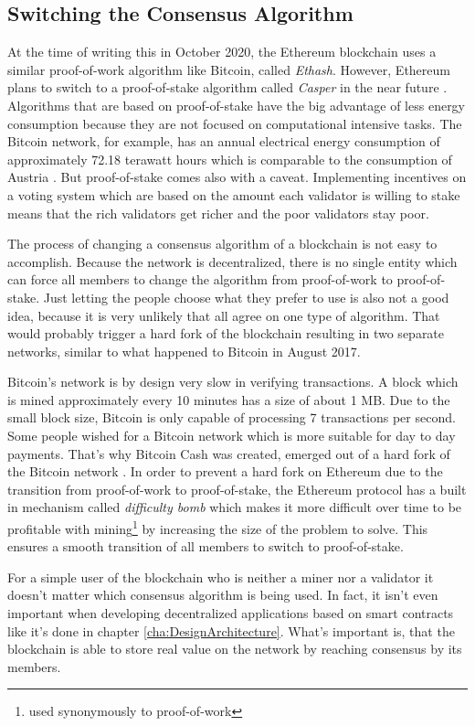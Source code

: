 \subsection{Switching the Consensus Algorithm}
At the time of writing this in October 2020, the Ethereum blockchain uses a similar proof-of-work algorithm like Bitcoin, called \textit{Ethash}. However, Ethereum plans to switch to a proof-of-stake algorithm called \textit{Casper} in the near future \cite{Twitter2018}. Algorithms that are based on proof-of-stake have the big advantage of less energy consumption because they are not focused on computational intensive tasks. The Bitcoin network, for example, has an annual electrical energy consumption of approximately 72.18 terawatt hours which is comparable to the consumption of Austria \cite{Digiconomist2020}. But proof-of-stake comes also with a caveat. Implementing incentives on a voting system which are based on the amount each validator is willing to stake means that the rich validators get richer and the poor validators stay poor.

The process of changing a consensus algorithm of a blockchain is not easy to accomplish. Because the network is decentralized, there is no single entity which can force all members to change the algorithm from proof-of-work to proof-of-stake. Just letting the people choose what they prefer to use is also not a good idea, because it is very unlikely that all agree on one type of algorithm. That would probably trigger a hard fork of the blockchain resulting in two separate networks, similar to what happened to Bitcoin in August 2017.

Bitcoin's network is by design very slow in verifying transactions. A block which is mined approximately every 10 minutes has a size of about 1 MB. Due to the small block size, Bitcoin is only capable of processing 7 transactions per second. Some people wished for a Bitcoin network which is more suitable for day to day payments. That's why Bitcoin Cash was created, emerged out of a hard fork of the Bitcoin network \cite{BitcoinCash2020}. In order to prevent a hard fork on Ethereum due to the transition from proof-of-work to proof-of-stake, the Ethereum protocol \cite{Wood2020} has a built in mechanism called \textit{difficulty bomb} which makes it more difficult over time to be profitable with mining\footnote{used synonymously to proof-of-work} by increasing the size of the problem to solve. This ensures a smooth transition of all members to switch to proof-of-stake.

For a simple user of the blockchain who is neither a miner nor a validator it doesn't matter which consensus algorithm is being used. In fact, it isn't even important when developing decentralized applications based on smart contracts like it's done in chapter \ref{cha:DesignArchitecture}. What's important is, that the blockchain is able to store real value on the network by reaching consensus by its members.

